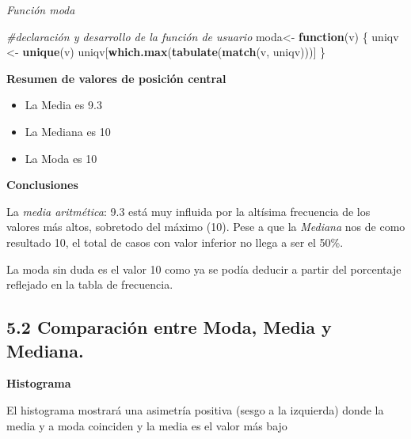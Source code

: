 \documentclass[
  12 pt,
  a4paper,
]{article}
\newenvironment{Shaded}{\begin{snugshade}}{\end{snugshade}}
\newcommand{\CommentTok}[1]{\textcolor[rgb]{0.56,0.35,0.01}{\textit{#1}}}
\newcommand{\ControlFlowTok}[1]{\textcolor[rgb]{0.13,0.29,0.53}{\textbf{#1}}}
\newcommand{\FunctionTok}[1]{\textcolor[rgb]{0.13,0.29,0.53}{\textbf{#1}}}
\newcommand{\NormalTok}[1]{#1}
\newcommand{\OtherTok}[1]{\textcolor[rgb]{0.56,0.35,0.01}{#1}}
\newcommand{\SpecialCharTok}[1]{\textcolor[rgb]{0.81,0.36,0.00}{\textbf{#1}}}
\providecommand{\tightlist}{%
  \setlength{\itemsep}{0pt}\setlength{\parskip}{0pt}}
\begin{document}
\emph{Función moda}

\begin{Shaded}
\begin{Highlighting}[]
\CommentTok{\#declaración y desarrollo de la función de usuario}
\NormalTok{moda}\OtherTok{\textless{}{-}} \ControlFlowTok{function}\NormalTok{(v) \{}
\NormalTok{uniqv }\OtherTok{\textless{}{-}} \FunctionTok{unique}\NormalTok{(v)}
\NormalTok{uniqv[}\FunctionTok{which.max}\NormalTok{(}\FunctionTok{tabulate}\NormalTok{(}\FunctionTok{match}\NormalTok{(v, uniqv)))]}
\NormalTok{\}}
\end{Highlighting}
\end{Shaded}

\begin{Shaded}
\end{Shaded}

\textbf{Resumen de valores de posición central}

\begin{itemize}
\tightlist
\item
  La Media es 9.3
\item
  La Mediana es 10
\item
  La Moda es 10
\end{itemize}

\textbf{Conclusiones}

La \emph{media aritmética}: 9.3 está muy influida por la altísima
frecuencia de los valores más altos, sobretodo del máximo (10). Pese a
que la \emph{Mediana} nos de como resultado 10, el total de casos con
valor inferior no llega a ser el 50\%.

La moda sin duda es el valor 10 como ya se podía deducir a partir del
porcentaje reflejado en la tabla de frecuencia.

\hypertarget{comparaciuxf3n-entre-moda-media-y-mediana.}{%
\subsection{5.2 Comparación entre Moda, Media y
Mediana.}\label{comparaciuxf3n-entre-moda-media-y-mediana.}}

\textbf{Histograma}

El histograma mostrará una asimetría positiva (sesgo a la izquierda)
donde la media y a moda coinciden y la media es el valor más bajo
\end{document}
